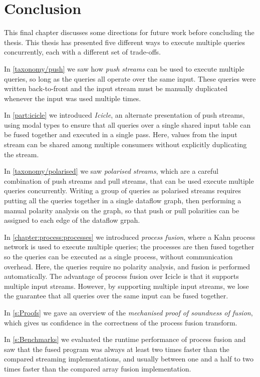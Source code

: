 \chapter{Conclusion}
\label{conclusion}

This final chapter discusses some directions for future work before concluding the thesis.
This thesis has presented five different ways to execute multiple queries concurrently, each with a different set of trade-offs.

In \cref{taxonomy/push} we saw how \emph{push streams} can be used to execute multiple queries, so long as the queries all operate over the same input.
These queries were written back-to-front and the input stream must be manually duplicated whenever the input was used multiple times.

In \cref{part:icicle} we introduced \emph{Icicle}, an alternate presentation of push streams, using modal types to ensure that all queries over a single shared input table can be fused together and executed in a single pass.
Here, values from the input stream can be shared among multiple consumers without explicitly duplicating the stream.

In \cref{taxonomy/polarised} we saw \emph{polarised streams}, which are a careful combination of push streams and pull streams, that can be used execute multiple queries concurrently.
Writing a group of queries as polarised streams requires putting all the queries together in a single dataflow graph, then performing a manual polarity analysis on the graph, so that push or pull polarities can be assigned to each edge of the dataflow grpah.

In \cref{chapter:process:processes} we introduced \emph{process fusion}, where a Kahn process network is used to execute multiple queries; the processes are then fused together so the queries can be executed as a single process, without communication overhead.
Here, the queries require no polarity analysis, and fusion is performed automatically.
The advantage of process fusion over Icicle is that it supports multiple input streams.
However, by supporting multiple input streams, we lose the guarantee that all queries over the same input can be fused together.

In \cref{s:Proofs} we gave an overview of the \emph{mechanised proof of soundness of fusion}, which gives us confidence in the correctness of the process fusion transform.

In \cref{s:Benchmarks} we evaluated the runtime performance of process fusion and saw that the fused program was always at least two times faster than the compared streaming implementations, and usually between one and a half to two times faster than the compared array fusion implementation.

